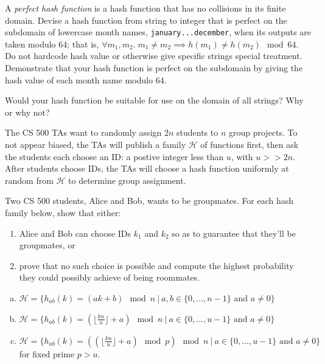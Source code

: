\documentclass{cs0500}
\begin{document}
\maketitle
\begin{problem}
    A \textit{perfect hash function} is a hash function that has no collisions in its finite domain. Devise a hash function from string to integer that is perfect on the subdomain of lowercase month names, \verb|january...december|, when its outputs are taken modulo 64; that is, $\forall m_1, m_2. \; m_1 \ne m_2 \implies h(m_1) \ne h(m_2) \mod{64}$. Do not hardcode hash value or otherwise give specific strings special treatment. Demonstrate that your hash function is perfect on the subdomain by giving the hash value of each month name modulo 64.

    Would your hash function be suitable for use on the domain of all strings? Why or why not?
\end{problem}
\newpage

\begin{problem}
    The CS 500 TAs want to randomly assign $2n$ students to $n$ group projects. To not appear biased, the TAs
    will publish a family $\mathcal{H}$ of functions first, then ask the students each choose an ID: a postive integer less than $u$, with $u >> 2n$. After
    students choose IDs, the TAs will choose a hash function uniformly at random from $\mathcal{H}$ to determine group assignment. 

    Two CS 500 students, Alice and Bob, wants to be groupmates. For each hash family below, show that either:
\begin{enumerate}
    \item Alice and Bob can choose IDs $k_1$ and $k_2$ so as to guarantee that they’ll be groupmates, or
    \item prove that no such choice is possible and compute the highest probability they could possibly
achieve of being roommates.
\end{enumerate}
\begin{enumerate}[(a)]
    \item $\mathcal{H} = \{h_{ab}(k) = (ak + b) \mod n ~|~ a, b \in \{0, . . . , n - 1\} \text{ and } a \neq 0\}$
    \item $\mathcal{H} = \{h_{ab}(k) = (\lfloor \frac{kn}{u}\rfloor + a) \mod n ~|~ a \in \{0, . . . , u-1\} \text{ and } a \neq 0\}$
    \item $\mathcal{H} = \{h_{ab}(k) = ((\lfloor \frac{kn}{u}\rfloor + a) \mod p) \mod n ~|~ a \in \{0, . . . , u-1\} \text{ and } a \neq 0\}$ for fixed prime $p > u$. 
\end{enumerate}
\end{problem}
\newpage
\end{document}
